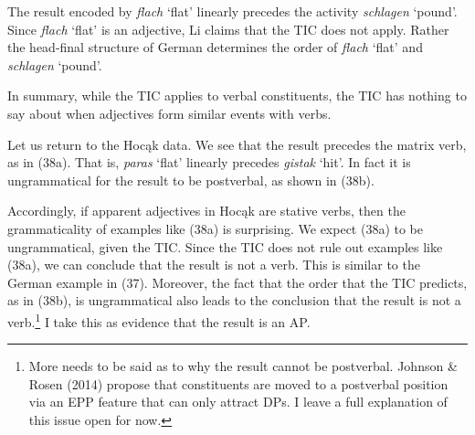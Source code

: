 \documentclass[output=paper]{LSP/langsci}
\begin{document}
The result encoded by \textit{flach} `flat' linearly precedes the activity \textit{schlagen} `pound'. Since \textit{flach} `flat' is an adjective, Li claims that the TIC does not apply. Rather the head-final structure of German determines the order of \textit{flach} `flat' and \textit{schlagen} `pound'. 

In summary, while the TIC applies to verbal constituents, the TIC has nothing to say about when adjectives form similar events with verbs.

Let us return to the Hoc\k{a}k data. We see that the result precedes the matrix verb, as in (38a). That is, \textit{paras} `flat' linearly precedes \textit{gistak} `hit'. In fact it is ungrammatical for the result to be postverbal, as shown in (38b).

\begin{exe}
\ex
\begin{xlist}



\end{xlist}
\end{exe}

Accordingly, if apparent adjectives in Hoc\k{a}k are stative verbs, then the grammaticality of examples like (38a) is surprising. We expect (38a) to be ungrammatical, given the TIC. Since the TIC does not rule out examples like (38a), we can conclude that the result is not a verb. This is similar to the German example in (37). Moreover, the fact that the order that the TIC predicts, as in (38b), is ungrammatical also leads to the conclusion that the result is not a verb.\footnote{More needs to be said as to why the result cannot be postverbal. Johnson \& Rosen (2014) propose that constituents are moved to a postverbal position via an EPP feature that can only attract DPs. I leave a full explanation of this issue open for now.} I take this as evidence that the result is an AP.
\end{document}
